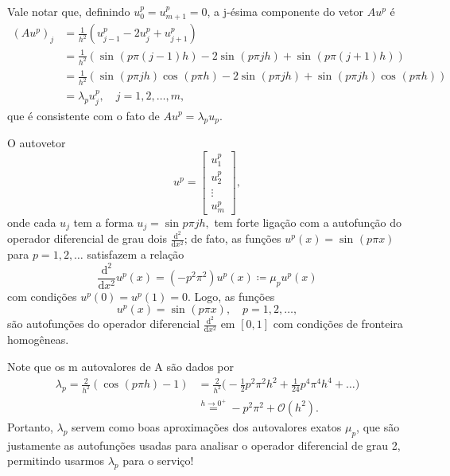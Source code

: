 \documentclass[../differential_methods.tex]{subfiles}
\begin{document}
Vale notar que, definindo \(u_{0}^{p} = u_{m+1}^{p} = 0\), a j-ésima componente do vetor \(Au^{p}\) é
\begin{align*}
	(Au^{p})_{j} & = \frac{1}{h^{2}}(u_{j-1}^{p}-2u_{j}^{p} + u_{j+1}^{p})                                                        \\
	             & = \frac{1}{h^{2}}(\sin^{}{(p\pi (j-1)h)}-2\sin^{}{(p\pi jh)}+\sin^{}{(p\pi (j+1)h)})                           \\
	             & = \frac{1}{h^{2}}(\sin^{}{(p\pi jh)}\cos^{}{(p\pi h)}-2\sin^{}{(p\pi jh)}+\sin^{}{(p\pi jh)}\cos^{}{(p\pi h)}) \\
	             & = \lambda_{p}u_{j}^{p},\quad j=1,2,\dotsc ,m,
\end{align*}
que é consistente com o fato de \(Au^{p}=\lambda_{p}u_{p}.\)
\begin{tcolorbox}[
		skin=enhanced,
		title=Observação,
		fonttitle=\bfseries,
		colframe=black,
		colbacktitle=cyan!75!white,
		colback=cyan!15,
		colbacklower=black,
		coltitle=black,
		drop fuzzy shadow,
	]
	O autovetor
	\[
		u^{p} = \begin{bmatrix}
			u_{1}^{p} \\
			u_{2}^{p} \\
			\vdots    \\
			u_{m}^{p}
		\end{bmatrix},
	\]
	onde cada \(u_{j}\) tem a forma \(u_{j}=\sin^{}{p\pi jh},\) tem forte ligação com a autofunção do operador diferencial de grau dois \(\frac{\mathrm{d}^{2}}{\mathrm{d}x^{2}}\); de fato, as funções \(u^{p}(x)=\sin^{}{(p\pi x)}\) para \(p=1,2,\dotsc \) satisfazem a relação
	\[
		\frac{\mathrm{d}^{2}}{\mathrm{d}x^{2}}u^{p}(x) = (-p^{2}\pi^{2})u^{p}(x)\coloneqq \mu_{p}u^{p}(x)
	\]
	com condições \(u^{p}(0)=u^{p}(1)=0\). Logo, as funções
	\[
		u^{p}(x)=\sin^{}{(p\pi x)},\quad p=1,2,\dotsc ,
	\]
	são autofunções do operador diferencial \(\frac{\mathrm{d}^{2}}{\mathrm{d}x^{2}}\) em \([0,1]\) com condições de fronteira homogêneas.
\end{tcolorbox}

Note que os m autovalores de A são dados por
\begin{align*}
	\lambda_{p} = \frac{2}{h^{2}}(\cos^{}{(p\pi h)}-1) & = \frac{2}{h^{2}}\biggl(-\frac{1}{2}p^{2}\pi^{2}h^{2}+\frac{1}{24}p^{4}\pi^{4}h^{4}+\dotsc \biggr) \\
	                                                   & \stackrel{h\to0^{+}}= -p^{2}\pi^{2} + \mathcal{O}(h^{2}).
\end{align*}
Portanto, \( \lambda_{p}\) servem como boas aproximações dos autovalores exatos \(\mu_{p}\), que são justamente as autofunções usadas para analisar o operador diferencial de grau 2, permitindo usarmos \( \lambda_{p}\) para o serviço!
\end{document}
